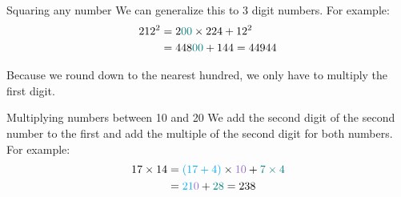 \documentclass[10pt, french]{article}
\begin{document}
\begin{multicols*}{3}
\begin{CHPT_SUMM}{Squaring any number}
We can generalize this to 3 digit numbers.
For example:
	\begin{align*}
	212^{2}	
	&=	2\textcolor{teal}{00} \times 224 + 12^{2}	\\
	&=	448\textcolor{teal}{00} + 144
	=	44944
	\end{align*}
	
Because we round down to the nearest hundred, we only have to multiply the first digit.
\end{CHPT_SUMM}

\begin{CHPT_SUMM}{Multiplying numbers between 10 and 20}
We add the second digit of the second number to the first and add the multiple of the second digit for both numbers.
For example:
	\begin{align*}
	17 \times 14
	&=	\textcolor{cyan}{(17 + 4)} \times \textcolor{amethyst}{10} + \textcolor{teal}{7 \times 4}	\\
	&=	\textcolor{cyan}{21}\textcolor{amethyst}{0} + \textcolor{teal}{28}	
	=	238
	\end{align*}
\end{CHPT_SUMM}

\end{multicols*}
\end{document}
